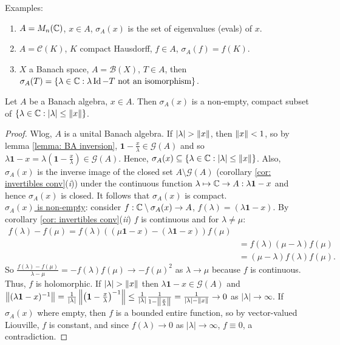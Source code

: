 \documentclass{article}
\begin{document}
\begin{examplesblock}{Examples:}\label{examples: 14}
    \begin{enumerate}
        \item $A=M_n(\mathbb{C})$, $x\in A$, $\sigma_A(x)$ is the set of eigenvalues (evals) of $x$. 
        \item $A = \mathcal{C}(K)$, $K$ compact Hausdorff, $f\in A$, $\sigma_A(f)=f(K)$.
        \item $X$ a Banach space, $A = \mathcal{B}(X)$, $T\in A$, then\\ $\sigma_A(T)=\{\lambda\in\mathbb{C}: \lambda\operatorname{Id}-T \text{ not an isomorphism}\}$.
        \end{enumerate}
\end{examplesblock}

\begin{theorem}\label{thm: spectrum non-empty}
    Let $A$ be a Banach algebra, $x\in A$. Then $\sigma_A(x)$ is a non-empty, compact subset of $\{\lambda\in \mathbb{C}: |\lambda|\leq \left\lVert x\right\rVert\}$.
\end{theorem}

\begin{proof}
    Wlog, $A$ is a unital Banach algebra. If $|\lambda|>\norm{x}$, then $\left\lVert x\right\rVert<1$, so by lemma \ref{lemma: BA inversion}, $\mathbf{1}-\frac{x}{\lambda}\in \mathcal{G}(A)$ and so $\lambda\mathbf{1}-x = \lambda(\mathbf{1}-\frac{x}{\lambda})\in\mathcal{G}(A)$. Hence, $\sigma_A(x)\subseteq \{\lambda\in \mathbb{C}: |\lambda|\leq \left\lVert x\right\rVert\}$. Also, $\sigma_A(x)$ is the inverse image of the closed set $A\setminus\mathcal{G}(A)$ (corollary \ref{cor: invertibles conv}(\textit{i})) under the continuous function $\lambda\mapsto \mathbb{C}\to A: \lambda\mathbf{1}-x$ and hence $\sigma_A(x)$ is closed. It follows that $\sigma_A(x)$ is compact.\\

    \noindent\underline{$\sigma_A(x)$ is non-empty}: consider $f:\C\setminus\sigma_A(x)\to A$, $f(\lambda)=(\lambda\mathbf{1}-x)$. By corollary \ref{cor: invertibles conv}(\textit{ii}) $f$ is continuous and for $\lambda\neq \mu$:
    $$
    \begin{array}{ll}
        
        f(\lambda)-f(\mu) = f(\lambda)((\mu\mathbf{1}-x)-(\lambda\mathbf{1}-x))f(\mu)\\
        &= f(\lambda)(\mu-\lambda)f(\mu)\\
        &= (\mu-\lambda)f(\lambda)f(\mu).
    \end{array}
    $$
    So $\frac{f(\lambda)-f(\mu)}{\lambda-\mu}=-f(\lambda)f(\mu)\to -f(\mu)^2$ as $\lambda\to \mu$ because $f$ is continuous. Thus, $f$ is holomorphic. If $|\lambda|>\norm{x}$ then $\lambda\mathbf{1}-x\in\mathcal{G}(A)$ and $\norm{(\lambda\mathbf{1}-x)^{-1}}=\frac{1}{|\lambda|}\norm{\left(\mathbf{1}-\frac{x}{\lambda}\right)^{-1}}\leq \frac{1}{|\lambda|}\frac{1}{1-\norm{\frac{x}{\lambda}}}=\frac{1}{|\lambda|-\norm{x}}\to 0$ as $|\lambda|\to \infty$. If $\sigma_A(x)$ where empty, then $f$ is a bounded entire function, so by vector-valued Liouville, $f$ is constant, and since $f(\lambda)\to 0$ as $|\lambda|\to \infty$, $f\equiv 0$, a contradiction.
\end{proof}
\end{document}
